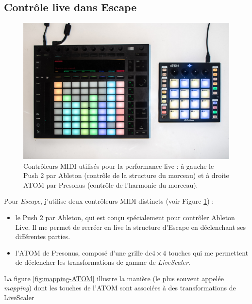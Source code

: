 \subsection{Contrôle live dans Escape}
\begin{figure}[htbp]
  \centering
  \includegraphics[width=\textwidth]{Figures/IMGP9899.jpg}
  \caption{Contrôleurs MIDI utilisés pour la performance live : à gauche le Push 2 par Ableton (contrôle de la structure du morceau) et à droite ATOM par Presonus (contrôle de l'harmonie du morceau).\label{fig:controleurs}}
\end{figure}
Pour \emph{Escape}, j'utilise deux contrôleurs MIDI distincts (voir Figure \ref{fig:controleurs}) :
\begin{itemize}
  \item le Push 2 par Ableton, qui est conçu spécialement pour contrôler Ableton Live. Il me permet de recréer en live la structure d'Escape en déclenchant ses différentes parties.
  \item l'ATOM de Presonus, composé d'une grille de$4\times 4$ touches qui me permettent de déclencher les transformations de gamme de \emph{LiveScaler}.
\end{itemize}

La figure \ref{fig:mapping-ATOM} illustre la manière (le plus souvent appelée \emph{mapping}) dont les touches de l'ATOM sont associées à des transformations de LiveScaler




